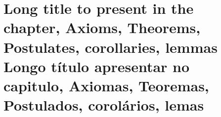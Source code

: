 
%


\chapter[\lang{Abbreviation for the Table of Contents}{Abreviação para o Sumário}]
{
    \lang
    {Long title to present in the chapter, Axioms, Theorems, Postulates, corollaries, lemmas}
    {Longo título apresentar no capitulo, Axiomas, Teoremas, Postulados, corolários, lemas}
}

\label{cap_exemplos}


\begin{flushright}
    \englishword{ }
\end{flushright}



